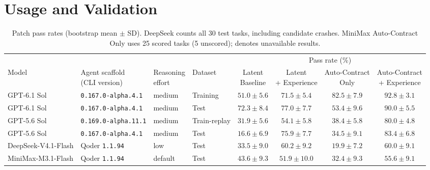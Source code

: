 \section{Usage and Validation}
\label{sec:usage}

\begin{table}[!t]
    \centering
    \caption{Patch pass rates (bootstrap mean $\pm$ SD). DeepSeek counts all 30 test tasks, including candidate crashes. MiniMax Auto-Contract Only uses 25 scored tasks (5 unscored); \textemdash{} denotes unavailable results.}
    \label{tab:tempoevo-main-evaluation}
    \small
    \setlength{\tabcolsep}{3pt}
    \begin{tabular*}{\textwidth}{@{\extracolsep{\fill}}llllcccc@{}}
        \toprule
        \multicolumn{4}{c}{} & \multicolumn{4}{c}{Pass rate (\%)} \\
        \cmidrule(lr){5-8}
        Model & \shortstack{Agent scaffold\\(CLI version)} & \shortstack{Reasoning\\effort}
        & Dataset & \shortstack{Latent\\Baseline}
        & \shortstack{Latent\\+ Experience}
        & \shortstack{Auto-Contract\\Only} & \shortstack{Auto-Contract\\+ Experience} \\
        \midrule
        GPT-6.1 Sol & \texttt{0.167.0-alpha.4.1} & medium & Training
        & $51.0 \pm 5.6$ & $71.5 \pm 5.4$ & $82.5 \pm 7.9$ & {\boldmath$92.8 \pm 3.1$} \\
        GPT-6.1 Sol & \texttt{0.167.0-alpha.4.1} & medium & Test
        & $72.3 \pm 8.4$ & $77.0 \pm 7.7$ & $53.4 \pm 9.6$ & {\boldmath$90.0 \pm 5.5$} \\
        \addlinespace
        GPT-5.6 Sol & \texttt{0.169.0-alpha.11.1} & medium & \mbox{Train-replay}
        & $31.9 \pm 5.6$ & $54.1 \pm 5.8$ & $38.4 \pm 5.8$ & {\boldmath$80.0 \pm 4.8$} \\
        GPT-5.6 Sol & \texttt{0.167.0-alpha.4.1} & medium & Test
        & $16.6 \pm 6.9$ & $75.9 \pm 7.7$ & $34.5 \pm 9.1$ & {\boldmath$83.4 \pm 6.8$} \\
        \addlinespace
        DeepSeek-V4.1-Flash & Qoder \texttt{1.1.94} & low & Test
        & $33.5 \pm 9.0$ & {\boldmath$60.2 \pm 9.2$} & $19.9 \pm 7.2$ & {\boldmath$60.0 \pm 9.1$} \\
        \addlinespace
        MiniMax-M3.1-Flash & Qoder \texttt{1.1.94} & default & Test
        & $43.6 \pm 9.3$ & $51.9 \pm 10.0$ & $32.4 \pm 9.3$ & {\boldmath$55.6 \pm 9.1$} \\
        \bottomrule
    \end{tabular*}
    \par\smallskip

\end{table}

